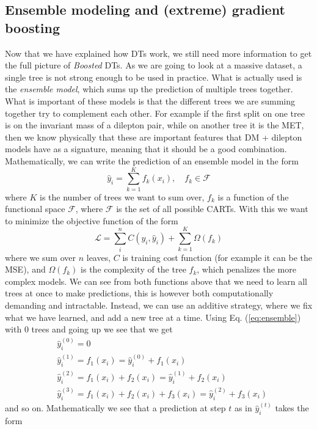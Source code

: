 \documentclass[12pt, a4paper]{book}
\begin{document}
\subsection{Ensemble modeling and (extreme) gradient boosting}
Now that we have explained how DTs work, we still need more information to get the full picture of \textit{Boosted} DTs. As we are going to look at a massive dataset, a single tree is not strong enough to be used in practice. What is actually used is the \textit{ensemble model}, which 
sums up the prediction of multiple trees together. What is important of these models is that the different trees we are summing together try to complement each other. For example if the first split on one tree is on the invariant mass of a dilepton pair, while on another tree it is the MET, 
then we know physically that these are important features that DM + dilepton models have as a signature, meaning that it should be a good combination. Mathematically, we can write the prediction of an ensemble model in the form
\begin{equation}\label{eq:ensemble}
    \hat{y}_i =\sum_{k=1}^{K}f_k(x_i),\quad f_k\in\mathcal{F}
\end{equation}
where $K$ is the number of trees we want to sum over, $f_k$ is a function of the functional space $\mathcal{F}$, where $\mathcal{F}$ is the set of all possible CARTs. With this we want to minimize the objective function of the form
$$
    \mathcal{L} = \sum_{i}^{n}C(y_i,\hat{y}_i)+\sum_{k=1}^{K}\Omega(f_k)
$$
where we sum over $n$ leaves, $C$ is training cost function (for example it can be the MSE), and $\Omega(f_k)$ is the complexity of the tree $f_k$, which penalizes the more complex models. We can see from both functions above that we need to learn all trees at once to make predictions, this is however both 
computationally demanding and intractable. Instead, we can use an additive strategy, where we fix what we have learned, and add a new tree at a time. Using Eq. (\ref{eq:ensemble}) with 0 trees and going up we see that we get
\begin{align*}
    &\hat{y}_i^{(0)} = 0\\
    &\hat{y}_i^{(1)} = f_1(x_i)=\hat{y}_i^{(0)}+f_1(x_i)\\
    &\hat{y}_i^{(2)} = f_1(x_i)+f_2(x_i)=\hat{y}_i^{(1)}+f_2(x_i)\\
    &\hat{y}_i^{(3)} = f_1(x_i)+f_2(x_i)+f_3(x_i)=\hat{y}_i^{(2)}+f_3(x_i)
\end{align*}
and so on. Mathematically we see that a prediction at step $t$ as in $\hat{y}_i^{(t)}$ takes the form
\end{document}
